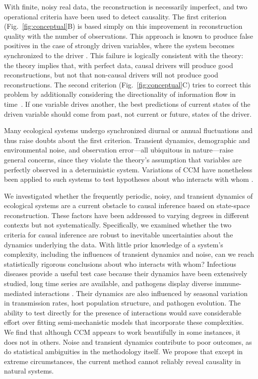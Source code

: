 \documentclass[10pt,letterpaper]{article}
\begin{document}
With finite, noisy real data, the reconstruction is necessarily imperfect, and two operational criteria have been used to detect causality.
The first criterion (Fig.~\ref{fig:conceptual}B) is based simply on this improvement in reconstruction quality with the number of observations.
This approach is known to produce false positives in the case of strongly driven variables, where the system becomes synchronized to the driver \cite{Sugihara2012, Kocarev1996}.
This failure is logically consistent with the theory: the theory implies that, with perfect data, causal drivers will produce good reconstructions, but not that non-causal drivers will not produce good reconstructions.
The second criterion (Fig.~\ref{fig:conceptual}C) tries to correct this problem by additionally considering the directionality of information flow in time~\cite{Ye2015}.
If one variable drives another, the best predictions of current states of the driven variable should come from past, not current or future, states of the driver.

Many ecological systems undergo synchronized diurnal or annual fluctuations and thus raise doubts about the first criterion.
Transient dynamics, demographic and environmental noise, and observation error---all ubiquitous in nature---raise general concerns, since they violate the theory's assumption that variables are perfectly observed in a deterministic system.
Variations of CCM have nonetheless been applied to such systems to test hypotheses about who interacts with whom \cite{Ye2015, Sugihara2012, Tajima2015, Tsonis2015, Clark2015}.

We investigated whether the frequently periodic, noisy, and transient dynamics of ecological systems are a current obstacle to causal inference based on state-space reconstruction.
These factors have been addressed to varying degrees in different contexts \cite{Sugihara2012, Ye2015, Clark2015} but not systematically.
Specifically, we examined whether the two criteria for causal inference are robust to inevitable uncertainties about the dynamics underlying the data.
With little prior knowledge of a system's complexity, including the influences of transient dynamics and noise, can we reach statistically rigorous conclusions about who interacts with whom?
Infectious diseases provide a useful test case because their dynamics have been extensively studied, long time series are available, and pathogens display diverse immune-mediated interactions \cite{Cobey2014}.  
Their dynamics are also influenced by seasonal variation in transmission rates, host population structure, and pathogen evolution.  
The ability to test directly for the presence of interactions would save considerable effort over fitting semi-mechanistic models that incorporate these complexities.
We find that although CCM appears to work beautifully in some instances, it does not in others.
Noise and transient dynamics contribute to poor outcomes, as do statistical ambiguities in the methodology itself.
We propose that except in extreme circumstances, the current method cannot reliably reveal causality in natural systems.
\end{document}
